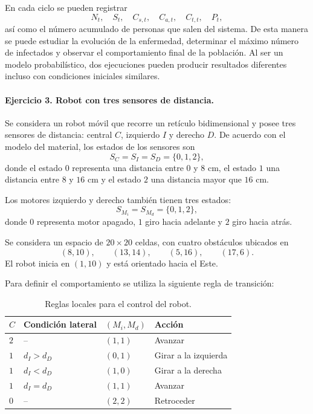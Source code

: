 \documentclass[14pt,twoside]{article}
\begin{document}
En cada ciclo se pueden registrar
\[
N_t,\quad S_t,\quad C_{s,t},\quad C_{a,t},\quad C_{t,t},\quad P_t,
\]
así como el número acumulado de personas que salen del sistema. De esta manera se
puede estudiar la evolución de la enfermedad, determinar el máximo número de infectados
y observar el comportamiento final de la población. Al ser un modelo probabilístico,
dos ejecuciones pueden producir resultados diferentes incluso con condiciones iniciales
similares.

\paragraph{Ejercicio 3. Robot con tres sensores de distancia.}

Se considera un robot móvil que recorre un retículo bidimensional y posee tres sensores
de distancia: central $C$, izquierdo $I$ y derecho $D$. De acuerdo con el modelo del
material, los estados de los sensores son
\[
S_C=S_I=S_D=\{0,1,2\},
\]
donde el estado $0$ representa una distancia entre $0$ y $8$ cm, el estado $1$ una
distancia entre $8$ y $16$ cm y el estado $2$ una distancia mayor que $16$ cm.

Los motores izquierdo y derecho también tienen tres estados:
\[
S_{M_i}=S_{M_d}=\{0,1,2\},
\]
donde $0$ representa motor apagado, $1$ giro hacia adelante y $2$ giro hacia atrás.

Se considera un espacio de $20\times20$ celdas, con cuatro obstáculos ubicados en
\[
(8,10),\qquad (13,14),\qquad (5,16),\qquad (17,6).
\]
El robot inicia en $(1,10)$ y está orientado hacia el Este.

Para definir el comportamiento se utiliza la siguiente regla de transición:

\begin{table}[H]
\centering
\caption{Reglas locales para el control del robot.}
\begin{tabularx}{0.92\textwidth}{>{\centering\arraybackslash}m{}>{\centering\arraybackslash}m{}>{\centering\arraybackslash}m{}>{\centering\arraybackslash}X}
\toprule
$C$ & Condición lateral & $(M_i,M_d)$ & Acción \\
\midrule
$2$ & -- & $(1,1)$ & Avanzar \\
$1$ & $d_I>d_D$ & $(0,1)$ & Girar a la izquierda \\
$1$ & $d_I<d_D$ & $(1,0)$ & Girar a la derecha \\
$1$ & $d_I=d_D$ & $(1,1)$ & Avanzar \\
$0$ & -- & $(2,2)$ & Retroceder \\
\bottomrule
\end{tabularx}
\end{table}
\end{document}
